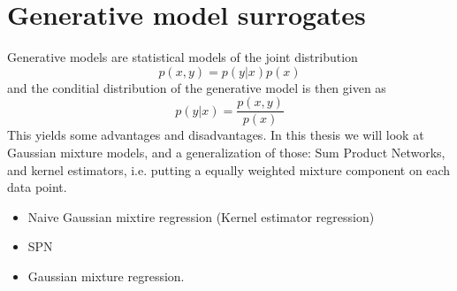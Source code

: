 \chapter{Generative model surrogates}
Generative models are statistical models of the joint distribution $$p(x,y) = p(y|x)p(x)$$
and the conditial distribution of the generative model is then given as $$p(y|x) = \frac{p(x,y)}{p(x)}$$
This yields some advantages and disadvantages. In this thesis we will look at
Gaussian mixture models, and a generalization of those: Sum Product Networks, 
and kernel estimators, i.e. putting a equally weighted mixture component on each data point. 
 \begin{itemize}
     \item Naive Gaussian mixtire regression (Kernel estimator regression)
     \item SPN
     \item Gaussian mixture regression. 
 \end{itemize}










